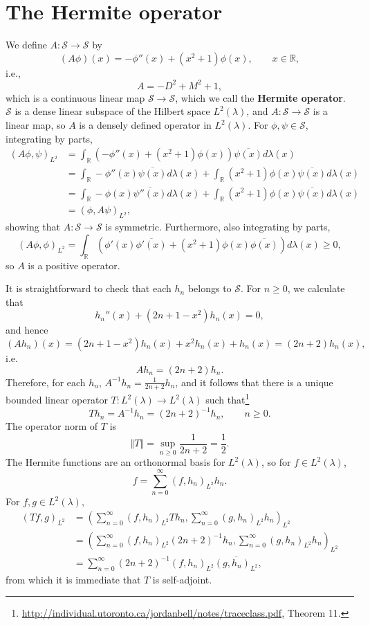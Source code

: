 \documentclass{article}
\newcommand{\norm}[1]{\left\Vert #1 \right\Vert}
\theoremstyle{definition}
\theoremstyle{definition}
\begin{document}
\section{The Hermite operator}
We define
$A:\mathscr{S}\to \mathscr{S}$ by
\[
(A\phi)(x) =-\phi''(x)+(x^2+1) \phi(x),\qquad x \in \mathbb{R},
\]
i.e.,
\[
A = -D^2 +M^2+1,
\]
which is a continuous linear map $\mathscr{S} \to \mathscr{S}$, which we call the \textbf{Hermite operator}. 
$\mathscr{S}$ is a dense linear subspace of the Hilbert space $L^2(\lambda)$, and $A:\mathscr{S} \to \mathscr{S}$ is a linear map, so
$A$ is a densely defined operator in $L^2(\lambda)$.
For $\phi,\psi \in \mathscr{S}$, integrating by parts,
\begin{align*}
(A\phi,\psi)_{L^2}&=\int_{\mathbb{R}} (-\phi''(x)+(x^2+1) \phi(x))\overline{\psi(x)} d\lambda(x)\\
&=\int_{\mathbb{R}} -\phi''(x) \overline{\psi(x)} d\lambda(x)+
\int_{\mathbb{R}} (x^2+1)\phi(x) \overline{\psi(x)} d\lambda(x)\\
&=\int_{\mathbb{R}} -\phi(x) \overline{\psi''(x)} d\lambda(x)+\int_{\mathbb{R}}
(x^2+1)\phi(x)\overline{\psi(x)} d\lambda(x)\\
&=(\phi,A\psi)_{L^2},
\end{align*}
showing that $A:\mathscr{S} \to \mathscr{S}$ is symmetric. 
Furthermore, also integrating by parts,
\[
(A\phi,\phi)_{L^2} = \int_{\mathbb{R}} (\phi'(x)\overline{\phi'(x)}+(x^2+1)\phi(x)\overline{\phi(x)}) d\lambda(x)
\geq 0,
\]
so $A$ is a positive operator.


It is straightforward to check that each $h_n$ belongs to $\mathscr{S}$.
For $n \geq 0$, we calculate that
\[
h_n''(x)+(2n+1-x^2)h_n(x)=0,
\]
and hence
\[
(Ah_n)(x) = (2n+1-x^2)h_n(x)+x^2h_n(x)+h_n(x)=(2n+2)h_n(x),
\]
i.e.
\[
Ah_n=(2n+2)h_n.
\]
Therefore, for each $h_n$, $A^{-1}h_n=\frac{1}{2n+2}h_n$, and it follows that there is
a unique bounded linear
operator
$T:L^2(\lambda) \to L^2(\lambda)$ 
 such that\footnote{\url{http://individual.utoronto.ca/jordanbell/notes/traceclass.pdf},
Theorem 11.}
\begin{equation}
 Th_n=A^{-1}h_n=(2n+2)^{-1}h_n,\qquad n \geq 0.
 \label{Ainverse}
\end{equation}
The operator norm of $T$ is
\[
\norm{T} = \sup_{n \geq 0} \frac{1}{2n+2} = \frac{1}{2}.
\]
The Hermite functions are an orthonormal basis for $L^2(\lambda)$, so for $f \in L^2(\lambda)$,
\[
f = \sum_{n=0}^\infty (f,h_n)_{L^2} h_n.
\]
For $f,g \in L^2(\lambda)$, 
\begin{align*}
(Tf,g)_{L^2}&=\left( \sum_{n=0}^\infty (f,h_n)_{L^2} Th_n, \sum_{n=0}^\infty (g,h_n)_{L^2} h_n\right)_{L^2}\\
&=\left( \sum_{n=0}^\infty (f,h_n)_{L^2} (2n+2)^{-1} h_n, \sum_{n=0}^\infty (g,h_n)_{L^2} h_n\right)_{L^2}\\
&=\sum_{n=0}^\infty (2n+2)^{-1} (f,h_n)_{L^2} \overline{(g,h_n)_{L^2}},
\end{align*}
from which it is immediate that $T$ is self-adjoint. 
\end{document}
